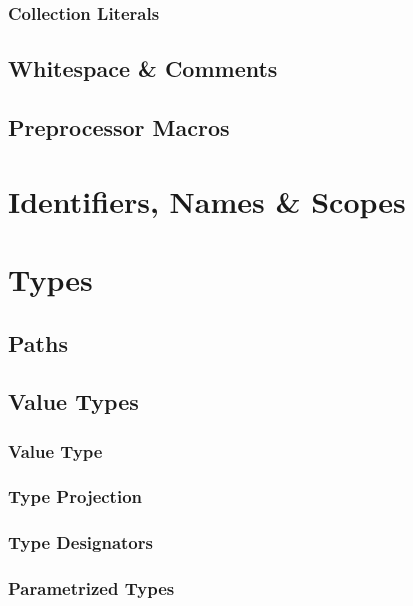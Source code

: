 \subsection{Collection Literals}\label{sec:collectionliterals}

\section{Whitespace \& Comments}\label{sec:whitespacecomments}

\section{Preprocessor Macros}\label{sec:preprocessormacros}

\chapter{Identifiers, Names \& Scopes}

\chapter{Types}

\section{Paths}

\section{Value Types}

\subsection{Value Type}

\subsection{Type Projection}

\subsection{Type Designators}

\subsection{Parametrized Types}

